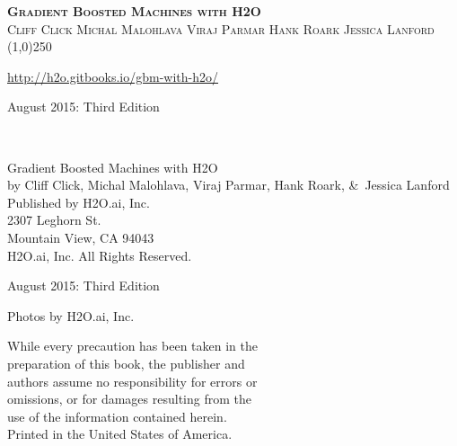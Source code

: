 








\thispagestyle{empty} %

\begin{center}
\textsc{\Large\bf{Gradient Boosted Machines with H2O}}
\\
\bigskip
\textsc{\small{Cliff Click \hspace{20pt} Michal Malohlava \hspace{20pt} Viraj Parmar \hspace{20pt} Hank Roark \hspace{20pt} Jessica Lanford}}
\\
\bigskip
\line(1,0){250}  %

{\url{http://h2o.gitbooks.io/gbm-with-h2o/}}

\bigskip
August 2015: Third Edition 
\\%
\bigskip
\end{center}

{\raggedright\vfill\ 

Gradient Boosted Machines with H2O\\
  by Cliff Click, Michal Malohlava, Viraj Parmar, Hank Roark, \&\ Jessica Lanford \\
\bigskip
  Published by H2O.ai, Inc. \\
2307 Leghorn St. \\
Mountain View, CA 94043\\
\bigskip
{} H2O.ai, Inc. All Rights Reserved. 
\bigskip

August 2015: Third Edition
\bigskip

Photos by \textcopyright H2O.ai, Inc.
\bigskip

While every precaution has been taken in the\\
preparation of this book, the publisher and\\
authors assume no responsibility for errors or\\
omissions, or for damages resulting from the\\
use of the information contained herein.\\
\bigskip
Printed in the United States of America. 
}


